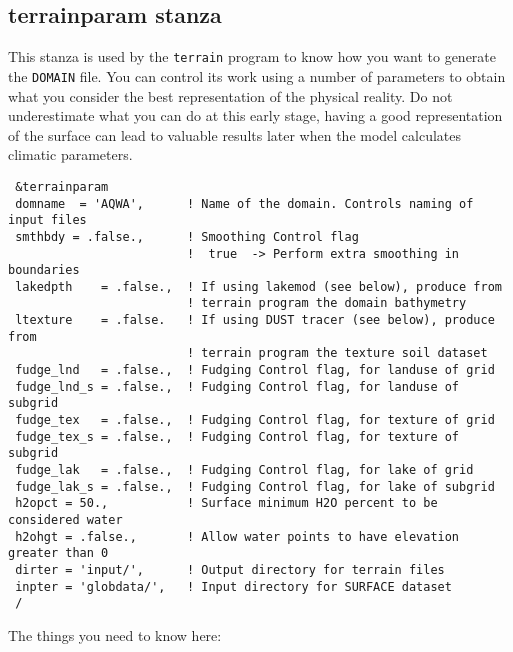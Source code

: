 \subsection{terrainparam stanza}
\label{terparam}
This stanza is used by the \verb=terrain= program to know how you want
to generate the \verb=DOMAIN= file. You can control its work using a number of
parameters to obtain what you consider the best representation of the
physical reality. Do not underestimate what you can do at this early stage,
having a good representation of the surface can lead to valuable results
later when the model calculates climatic parameters.

{\footnotesize
\begin{Verbatim}
 &terrainparam
 domname  = 'AQWA',      ! Name of the domain. Controls naming of input files
 smthbdy = .false.,      ! Smoothing Control flag
                         !  true  -> Perform extra smoothing in boundaries
 lakedpth    = .false.,  ! If using lakemod (see below), produce from
                         ! terrain program the domain bathymetry
 ltexture    = .false.   ! If using DUST tracer (see below), produce from
                         ! terrain program the texture soil dataset
 fudge_lnd   = .false.,  ! Fudging Control flag, for landuse of grid
 fudge_lnd_s = .false.,  ! Fudging Control flag, for landuse of subgrid
 fudge_tex   = .false.,  ! Fudging Control flag, for texture of grid
 fudge_tex_s = .false.,  ! Fudging Control flag, for texture of subgrid
 fudge_lak   = .false.,  ! Fudging Control flag, for lake of grid
 fudge_lak_s = .false.,  ! Fudging Control flag, for lake of subgrid
 h2opct = 50.,           ! Surface minimum H2O percent to be considered water
 h2ohgt = .false.,       ! Allow water points to have elevation greater than 0
 dirter = 'input/',      ! Output directory for terrain files
 inpter = 'globdata/',   ! Input directory for SURFACE dataset
 /
\end{Verbatim}
}

The things you need to know here:

